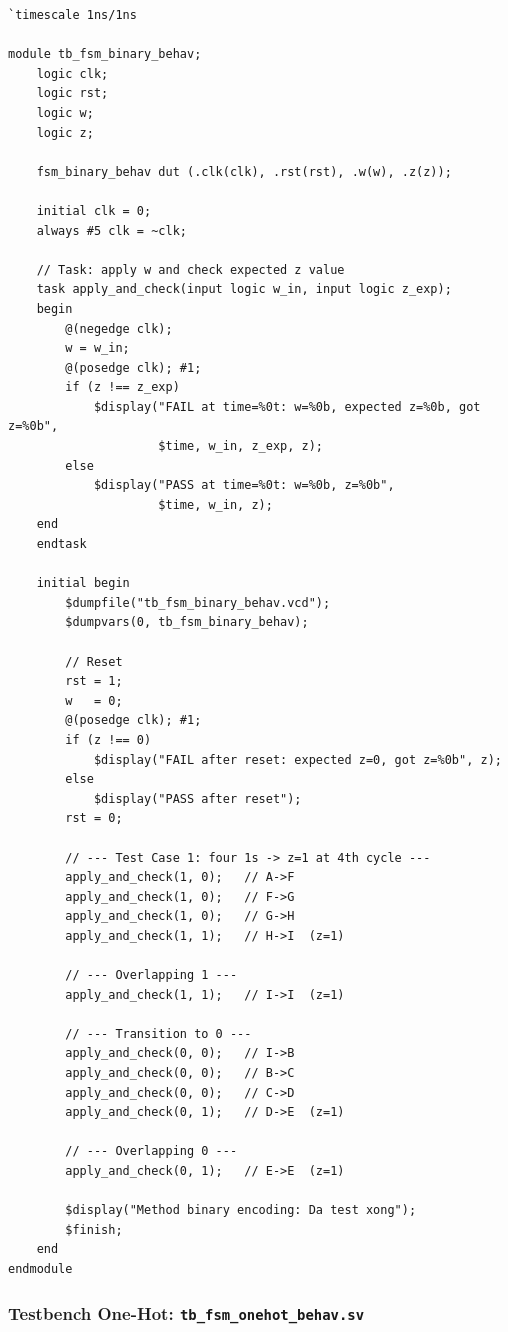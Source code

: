 \documentclass[12pt, a4paper]{article}
\begin{document}
\begin{lstlisting}[caption={\texttt{01\_tb/tb\_fsm\_binary\_behav.sv} -- Testbench cho fsm\_binary\_behav.},
                   label={lst:exp4-tb-bin}]
`timescale 1ns/1ns

module tb_fsm_binary_behav;
    logic clk;
    logic rst;
    logic w;
    logic z;

    fsm_binary_behav dut (.clk(clk), .rst(rst), .w(w), .z(z));

    initial clk = 0;
    always #5 clk = ~clk;

    // Task: apply w and check expected z value
    task apply_and_check(input logic w_in, input logic z_exp);
    begin
        @(negedge clk);
        w = w_in;
        @(posedge clk); #1;
        if (z !== z_exp)
            $display("FAIL at time=%0t: w=%0b, expected z=%0b, got z=%0b",
                     $time, w_in, z_exp, z);
        else
            $display("PASS at time=%0t: w=%0b, z=%0b",
                     $time, w_in, z);
    end
    endtask

    initial begin
        $dumpfile("tb_fsm_binary_behav.vcd");
        $dumpvars(0, tb_fsm_binary_behav);

        // Reset
        rst = 1;
        w   = 0;
        @(posedge clk); #1;
        if (z !== 0)
            $display("FAIL after reset: expected z=0, got z=%0b", z);
        else
            $display("PASS after reset");
        rst = 0;

        // --- Test Case 1: four 1s -> z=1 at 4th cycle ---
        apply_and_check(1, 0);   // A->F
        apply_and_check(1, 0);   // F->G
        apply_and_check(1, 0);   // G->H
        apply_and_check(1, 1);   // H->I  (z=1)

        // --- Overlapping 1 ---
        apply_and_check(1, 1);   // I->I  (z=1)

        // --- Transition to 0 ---
        apply_and_check(0, 0);   // I->B
        apply_and_check(0, 0);   // B->C
        apply_and_check(0, 0);   // C->D
        apply_and_check(0, 1);   // D->E  (z=1)

        // --- Overlapping 0 ---
        apply_and_check(0, 1);   // E->E  (z=1)

        $display("Method binary encoding: Da test xong");
        $finish;
    end
endmodule
\end{lstlisting}

\subsubsection{Testbench One-Hot: \texttt{tb\_fsm\_onehot\_behav.sv}}
\end{document}
